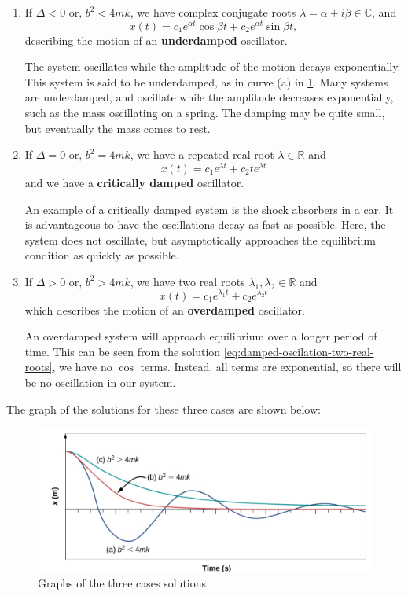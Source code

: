 \documentclass[math,code]{amznotes}
\theoremstyle{remark}
\begin{document}
\begin{enumerate}
    \item If $\Delta<0\text{ or, }b^2<4mk$, we have complex conjugate roots $\lambda=\alpha+i\beta\in\mathbb{C}$, and
    \begin{equation} \label{eq:damped-oscilation-complex-roots}
        x(t)=c_1e^{\alpha t}\cos\beta t+c_2e^{\alpha t}\sin\beta t,
    \end{equation}
    describing the motion of an \textbf{underdamped} oscillator.
    
    The system oscillates while the amplitude of the motion decays exponentially. This system is said to be underdamped, as in curve (a) in \ref{fig:damped-oscillator-three-cases}. Many systems are underdamped, and oscillate while the amplitude decreases exponentially, such as the mass oscillating on a spring. The damping may be quite small, but eventually the mass comes to rest.
    \item If $\Delta=0\text{ or, }b^2=4mk$, we have a repeated real root $\lambda\in\mathbb{R}$ and
    \begin{equation}
        x(t)=c_1e^{\lambda t}+c_2te^{\lambda t}
    \end{equation}
    and we have a \textbf{critically damped} oscillator.
    
    An example of a critically damped system is the shock absorbers in a car. It is advantageous to have the oscillations decay as fast as possible. Here, the system does not oscillate, but asymptotically approaches the equilibrium condition as quickly as possible.
    \item If $\Delta>0\text{ or, }b^2>4mk$, we have two real roots $\lambda_1,\lambda_2\in \mathbb{R}$ and
    \begin{equation} \label{eq:damped-oscilation-two-real-roots}
        x(t)=c_1e^{\lambda_1t}+c_2e^{\lambda_2t}
    \end{equation}
    which describes the motion of an \textbf{overdamped} oscillator.

    An overdamped system will approach equilibrium over a longer period of time. This can be seen from the solution \ref{eq:damped-oscilation-two-real-roots}, we have no $\cos$ terms. Instead, all terms are exponential, so there will be no oscillation in our system.
\end{enumerate}
The graph of the solutions for these three cases are shown below:
\begin{figure}[h]
    \centering
    \includegraphics[width=0.75\linewidth]{images/damped-oscillator-three-cases.png}
    \caption{Graphs of the three cases solutions}
    \label{fig:damped-oscillator-three-cases}
\end{figure}
\end{document}
